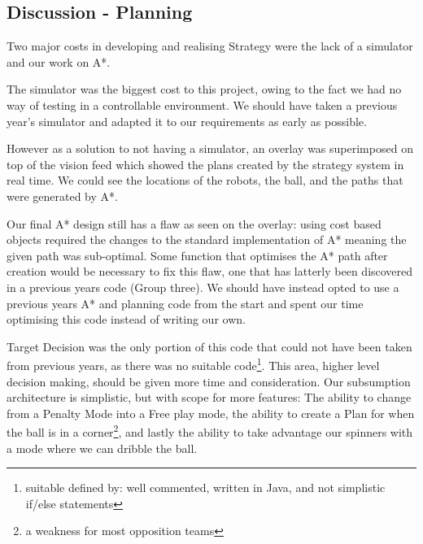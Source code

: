 \subsection{Discussion - Planning}


Two major costs in developing and realising Strategy were the lack of a 
simulator and our work on A*. 

The simulator was the biggest cost to this project, owing to the fact we had
no way of testing in a controllable environment. We should
have taken a previous year's simulator and adapted it to our requirements as
early as possible. 

However as a solution to not having a simulator, an overlay was superimposed on
top of the vision feed which showed the plans created by the strategy system in
real time. We could see the locations of the robots, the ball, and the paths
that were generated by A*. 

Our final A* design still has a flaw as seen on the overlay: using cost based
objects required the changes to the standard implementation of A* meaning the
given path was sub-optimal. Some function that optimises the A* path after
creation would be necessary to fix this flaw, one that has latterly been
discovered in a previous years code (Group three). We should have instead opted
to use a previous years A* and planning code from the start and spent our time
optimising this code instead of writing our own.

Target Decision was the only portion of this code that could not have been
taken from previous years, as there was no suitable code\footnote{suitable
defined by: well commented, written in Java, and not simplistic if/else
statements}. This area, higher level decision making, should be given more time
and consideration.  Our subsumption architecture is simplistic, but with scope
for more features: The ability to change from a Penalty Mode into a Free play
mode, the ability to create a Plan for when the ball is in a corner\footnote{a
weakness for most opposition teams}, and lastly the ability to take advantage
our spinners with a mode where we can dribble the ball.


